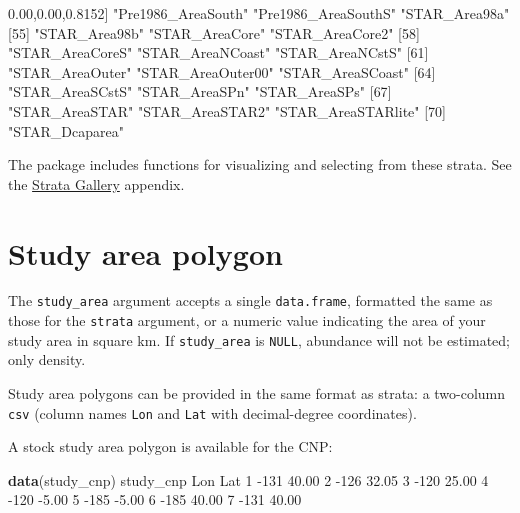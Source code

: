 \documentclass[
]{book}
\newenvironment{Shaded}{\begin{snugshade}}{\end{snugshade}}
\newcommand{\DecValTok}[1]{\textcolor[rgb]{0.00,0.00,0.81}{#1}}
\newcommand{\FloatTok}[1]{\textcolor[rgb]{0.00,0.00,0.81}{#1}}
\newcommand{\KeywordTok}[1]{\textcolor[rgb]{0.13,0.29,0.53}{\textbf{#1}}}
\newcommand{\NormalTok}[1]{#1}
\newcommand{\StringTok}[1]{\textcolor[rgb]{0.31,0.60,0.02}{#1}}
\begin{document}
\begin{Shaded}
\begin{Highlighting}[]
\NormalTok{[}\DecValTok{52}\NormalTok{] }\StringTok{"Pre1986_AreaSouth"}  \StringTok{"Pre1986_AreaSouthS"} \StringTok{"STAR_Area98a"}      
\NormalTok{[}\DecValTok{55}\NormalTok{] }\StringTok{"STAR_Area98b"}       \StringTok{"STAR_AreaCore"}      \StringTok{"STAR_AreaCore2"}    
\NormalTok{[}\DecValTok{58}\NormalTok{] }\StringTok{"STAR_AreaCoreS"}     \StringTok{"STAR_AreaNCoast"}    \StringTok{"STAR_AreaNCstS"}    
\NormalTok{[}\DecValTok{61}\NormalTok{] }\StringTok{"STAR_AreaOuter"}     \StringTok{"STAR_AreaOuter00"}   \StringTok{"STAR_AreaSCoast"}   
\NormalTok{[}\DecValTok{64}\NormalTok{] }\StringTok{"STAR_AreaSCstS"}     \StringTok{"STAR_AreaSPn"}       \StringTok{"STAR_AreaSPs"}      
\NormalTok{[}\DecValTok{67}\NormalTok{] }\StringTok{"STAR_AreaSTAR"}      \StringTok{"STAR_AreaSTAR2"}     \StringTok{"STAR_AreaSTARlite"} 
\NormalTok{[}\DecValTok{70}\NormalTok{] }\StringTok{"STAR_Dcaparea"}     
\end{Highlighting}
\end{Shaded}

The package includes functions for visualizing and selecting from these strata. See the \protect\hyperlink{stratagallery}{Strata Gallery} appendix.

\hypertarget{study-area-polygon}{%
\section*{Study area polygon}\label{study-area-polygon}}

The \texttt{study\_area} argument accepts a single \texttt{data.frame}, formatted the same as those for the \texttt{strata} argument, or a numeric value indicating the area of your study area in square km. If \texttt{study\_area} is \texttt{NULL}, abundance will not be estimated; only density.

Study area polygons can be provided in the same format as strata: a two-column \texttt{csv} (column names \texttt{Lon} and \texttt{Lat} with decimal-degree coordinates).

A stock study area polygon is available for the CNP:

\begin{Shaded}
\begin{Highlighting}[]
\KeywordTok{data}\NormalTok{(study_cnp) }
\NormalTok{study_cnp}
\NormalTok{   Lon   Lat}
\DecValTok{1} \DecValTok{-131} \FloatTok{40.00}
\DecValTok{2} \DecValTok{-126} \FloatTok{32.05}
\DecValTok{3} \DecValTok{-120} \FloatTok{25.00}
\DecValTok{4} \DecValTok{-120} \FloatTok{-5.00}
\DecValTok{5} \DecValTok{-185} \FloatTok{-5.00}
\DecValTok{6} \DecValTok{-185} \FloatTok{40.00}
\DecValTok{7} \DecValTok{-131} \FloatTok{40.00}
\end{Highlighting}
\end{Shaded}
\end{document}
